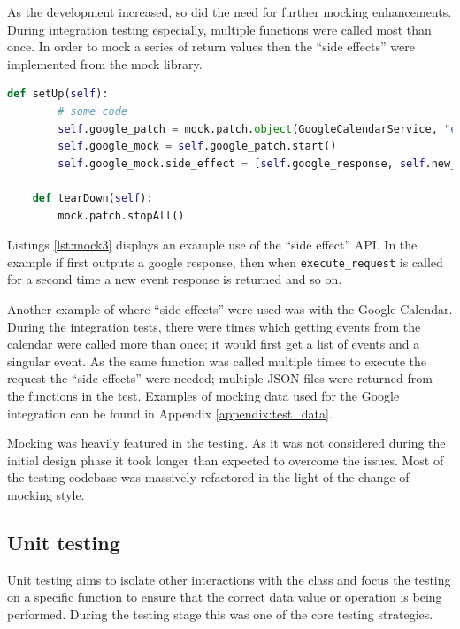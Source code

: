 As the development increased, so did the need for further mocking enhancements. During integration testing especially, multiple functions were called most than once. In order to mock a series of return values then the ``side effects'' were implemented from the mock library.

\begin{lstlisting}[language=python, label={lst:mock3}, breaklines, columns=fullflexible, keywordstyle=\color{blue}, basicstyle=\normalsize\ttfamily]
    def setUp(self):
        # some code
        self.google_patch = mock.patch.object(GoogleCalendarService, "execute_request")
        self.google_mock = self.google_patch.start()
        self.google_mock.side_effect = [self.google_response, self.new_event, self.google_response, self.updated_response]

    def tearDown(self):
        mock.patch.stopAll()
\end{lstlisting}

Listings \ref{lst:mock3} displays an example use of the ``side effect'' API. In the example if first outputs a google response, then when \texttt{execute\_request} is called for a second time a new event response is returned and so on.

Another example of where ``side effects'' were used was with the Google Calendar. During the integration tests, there were times which getting events from the calendar were called more than once; it would first get a list of events and a singular event. As the same function was called multiple times to execute the request the ``side effects'' were needed; multiple JSON files were returned from the functions in the test. Examples of mocking data used for the Google integration can be found in Appendix \ref{appendix:test_data}.

Mocking was heavily featured in the testing. As it was not considered during the initial design phase it took longer than expected to overcome the issues. Most of the testing codebase was massively refactored in the light of the change of mocking style.

\subsection{Unit testing}
Unit testing aims to isolate other interactions with the class and focus the testing on a specific function to ensure that the correct data value or operation is being performed. During the testing stage this was one of the core testing strategies.

